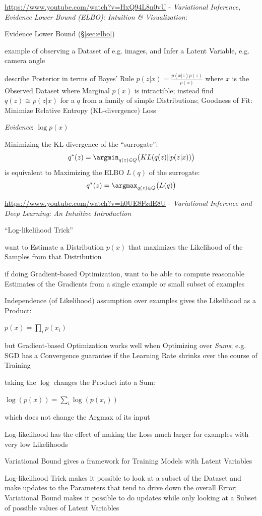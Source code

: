 \url{https://www.youtube.com/watch?v=HxQ94L8n0vU} -
\emph{Variational Inference, Evidence Lower Bound (ELBO): Intuition &
Visualization}:

Evidence Lower Bound (\S\ref{sec:elbo})

example of observing a Dataset of e.g. images, and Infer a Latent Variable, e.g.
camera angle

describe Posterior in terms of Bayes' Rule $p(z|x) = \frac{p(x|z) p(z)}{p(x)}$
where $x$ is the Observed Dataset where Marginal $p(x)$ is intractible; instead
find $q(z) \cong p(z|x)$ for a $q$ from a family of simple Distributions;
Goodness of Fit: Minimize Relative Entropy (KL-divergence) Loss

\emph{Evidence}: $\log p(x)$

Minimizing the KL-divergence of the ``surrogate'':
\[
q^*(z) = \argmin_{q(z) \in Q}\big(KL(q(z) \| p(z|x))\big)
\]
is equivalent to Maximizing the ELBO $L(q)$ of the surrogate:
\[
q^*(z) = \argmax_{q(z) \in Q}\big(L(q)\big)
\]

\url{https://www.youtube.com/watch?v=h0UE8FzdE8U} -
\emph{Variational Inference and Deep Learning: An Intuitive Introduction}

``Log-likelihood Trick''

want to Estimate a Distribution $p(x)$ that maximizes the Likelihood of the
Samples from that Distribution

if doing Gradient-based Optimization, want to be able to compute reasonable
Estimates of the Gradients from a single example or small subset of examples

Independence (of Likelihood) assumption over examples gives the Likelihood as a
Product:

$p(x) = \prod_i p(x_i)$

but Gradient-based Optimization works well when Optimizing over \emph{Sums};
e.g. SGD has a Convergence guarantee if the Learning Rate shrinks over the
course of Training

taking the $\log$ changes the Product into a Sum:

$\log(p(x)) = \sum_i \log(p(x_i))$

which does not change the Argmax of its input

Log-likelihood has the effect of making the Loss much larger for examples with
very low Likelihoods

Variational Bound gives a framework for Training Models with Latent Variables

Log-likelihood Trick makes it possible to look at a subset of the Dataset and
make updates to the Parameters that tend to drive down the overall Error;
Variational Bound makes it possible to do updates while only looking at a Subset
of possible values of Latent Variables

